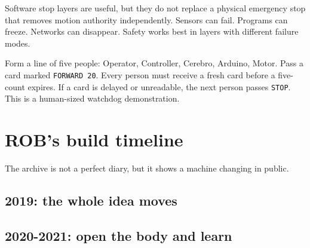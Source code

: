 \documentclass[11pt,openany]{book}
\begin{document}
\ROBStopChainDiagram

\begin{safetybox}
Software stop layers are useful, but they do not replace a physical emergency stop that removes motion authority independently. Sensors can fail. Programs can freeze. Networks can disappear. Safety works best in layers with different failure modes.
\end{safetybox}

\begin{missionbox}[title={MESSAGE RELAY}]
Form a line of five people: Operator, Controller, Cerebro, Arduino, Motor. Pass a card marked \texttt{FORWARD 20}. Every person must receive a fresh card before a five-count expires. If a card is delayed or unreadable, the next person passes \texttt{STOP}. This is a human-sized watchdog demonstration.
\end{missionbox}


\chapter{ROB's build timeline}

The archive is not a perfect diary, but it shows a machine changing in public.

\section*{2019: the whole idea moves}

\section*{2020-2021: open the body and learn}
\end{document}

